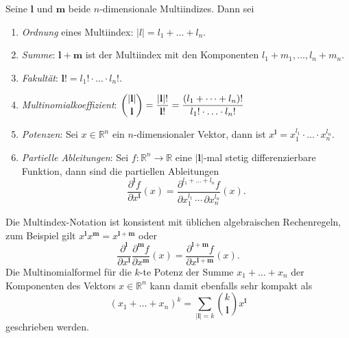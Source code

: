 \begin{definition}
Seine $\mathbf{l}$ und $\mathbf{m}$ beide $n$-dimensionale Multiindizes.
Dann sei
\begin{enumerate}
\item {\em Ordnung} eines Multiindex: $|l|=l_1+\dots+l_n$.
%
\item {\em Summe}: $\mathbf{l}+\mathbf{m}$ ist der Multiindex mit
den Komponenten $l_1+m_1,\dots,l_n+m_n$.
\item {\em Fakultät}: $\mathbf{l}! = l_1!\cdot \ldots\cdot l_n!$.
%
\item {\em Multinomialkoeffizient}: $\displaystyle
\index{Multinomialkoeffizient}%
\binom{|\mathbf{l}|}{\mathbf{l}}
=
\frac{|\mathbf{l}|!}{\mathbf{l}!}
=
\frac{(l_1+\dots+l_n)!}{l_1!\cdot\ldots\cdot l_n!}
$
\item {\em Potenzen}: Sei $x\in\mathbb{R}^n$ ein $n$-dimensionaler Vektor,
dann ist $x^{\mathbf{l}} = x_1^{l_1}\cdot\ldots\cdot x_n^{l_n}$.
\item {\em Partielle Ableitungen}: Sei $f\colon\mathbb{R}^n\to\mathbb{R}$
eine $|\mathbf{l}|$-mal stetig differenzierbare Funktion, dann sind die
partiellen Ableitungen
\[
\frac{\partial^{\mathbf{l}} f}{\partial x^{\mathbf{l}}}(x)
=
\frac{\partial^{l_1+\dots+l_n} f}{\partial x_1^{l_1}\,\cdots\,\partial x_n^{l_n}}(x).
\]
\end{enumerate}
\end{definition}
Die Multindex-Notation ist konsistent mit üblichen algebraischen
Rechenregeln, zum Beispiel gilt
$x^{\mathbf{l}}x^{\mathbf{m}}=x^{\mathbf{l}+\mathbf{m}}$
oder 
\[
\frac{\partial^{\mathbf{l}}}{\partial x^{\mathbf{l}}}
\frac{\partial^{\mathbf{m}}f}{\partial x^{\mathbf{m}}}(x)
=
\frac{\partial^{\mathbf{l}+\mathbf{m}}f}{\partial x^{\mathbf{l}+\mathbf{m}}}(x).
\]
Die Multinomialformel für die $k$-te Potenz der Summe
$x_1+\dots+x_n$ der Komponenten des Vektors $x\in\mathbb{R}^n$
kann damit ebenfalls sehr kompakt als
\[
(x_1+\dots+x_n)^{k}
=
\sum_{|\mathbf{l}|=k}
\binom{k}{\mathbf{l}} x^{\mathbf{l}}
\]
geschrieben werden.

%
%
